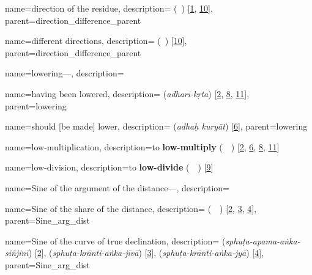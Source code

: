 {
        name={direction of the residue},
        description={ (\jahat\idafaconsonant\ \fadla) [\hyperlink{PEpass1}{1}, \hyperlink{PEpass10}{10}]},
        parent={direction_difference_parent}
}

{
        name={different directions},
        description={ (\jahat\idafaconsonant\ \mukhtalif) [\hyperlink{PEpass10}{10}]},
        parent={direction_difference_parent}
}

{       
        name={lowering---},
        description={\phantom{x}\nopagebreak}
}        

{
        name={having been lowered},
        description={ (\textit{adharī-kṛta}) [\hyperlink{SEpass2}{2}, \hyperlink{SEpass8}{8}, \hyperlink{SEpass11}{11}]},
        parent={lowering}
}

{
        name={should [be made] lower},
        description={ (\textit{adhaḥ kuryāt}) [\hyperlink{SEpass6}{6}]},
        parent={lowering}
}


{
        name={low-multiplication},
        description={\newline to \textbf{low-multiply} \quad {} (\munhatt\idafaconsonant\ \darb\ \mbox{\kardan}) [\hyperlink{PEpass2}{2}, \hyperlink{PEpass6}{6}, \hyperlink{PEpass8}{8}, \hyperlink{PEpass11}{11}]}
}

{
        name={low-division},
        description={to \textbf{low-divide}\quad {} (\munhatt\idafaconsonant\ \qismat\ \kardan) [\hyperlink{PEpass9}{9}]}
}

{
        name={Sine of the argument of the distance---},
        description={\phantom{x}\nopagebreak}
}

{
        name={Sine of the share of the distance},
        description={ (\jayb\idafaconsonant\ \hissi\idafavowel\ \bud) [\hyperlink{PEpass2}{2}, \hyperlink{PEpass3}{3}, \hyperlink{PEpass4}{4}]},
        parent={Sine_arg_dist}
}

{
        name={Sine of the curve of true declination},
        description={  (\textit{sphuṭa-apama-aṅka-siñjinī}) [\hyperlink{SEpass2}{2}],  (\textit{sphuṭa-krānti-aṅka-jīvā}) [\hyperlink{SEpass3}{3}],  (\textit{sphuṭa-krānti-aṅka-jyā}) [\hyperlink{SEpass4}{4}]},
        parent={Sine_arg_dist}
}

